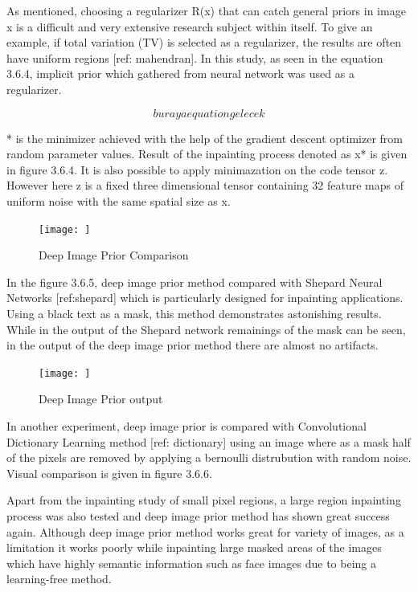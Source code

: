As mentioned, choosing a regularizer R(x) that can catch general priors in image x is a difficult and very extensive research subject within itself. To give an example, if total variation (TV) is selected as a regularizer, the results are often have uniform regions [ref: mahendran]. In this study, as seen in the equation 3.6.4, implicit prior which gathered from neural network was used as a regularizer.

\begin{equation}
    buraya equation gelecek
\end{equation}

* is the minimizer achieved with the help of the gradient descent optimizer from random parameter values. Result of the inpainting process denoted as x* is given in figure 3.6.4. It is also possible to apply minimazation on the code tensor z. However here z is a fixed three dimensional tensor containing 32 feature maps of uniform noise with the same spatial size as x.

\begin{figure}[h]
    \centering
    \texttt{[image: ]}
    \caption{Deep Image Prior Comparison}
    \label{fig:my_label}
\end{figure}

In the figure 3.6.5, deep image prior method compared with Shepard Neural Networks [ref:shepard] which is particularly designed for inpainting applications. Using a black text as a mask, this method demonstrates astonishing results. While in the output of the Shepard network remainings of the mask can be seen, in the output of the deep image prior method there are almost no artifacts.

\begin{figure}[h]
    \centering
    \texttt{[image: ]}
    \caption{Deep Image Prior output}
    \label{fig:my_label}
\end{figure}

In another experiment, deep image prior is compared with Convolutional Dictionary Learning method [ref: dictionary] using an image where as a mask half of the pixels are removed by applying a bernoulli distrubution with random noise. Visual comparison is given in figure 3.6.6.

Apart from the inpainting study of small pixel regions, a large region inpainting process was also tested and deep image prior method has shown great success again. Although deep image prior method works great for variety of images, as a limitation it works poorly while inpainting large masked areas of the images which have highly semantic information such as face images due to being a learning-free method.

